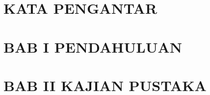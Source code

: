 \documentclass[10pt]{report}
\begin{document}
  
  \chapter*{KATA PENGANTAR}
  
  \chapter*{BAB I PENDAHULUAN}
  \chapter*{BAB II KAJIAN PUSTAKA}
\end{document}
